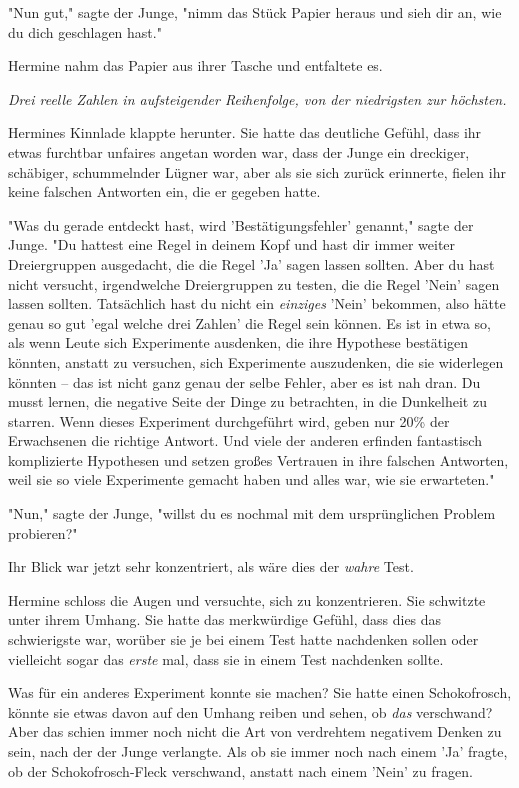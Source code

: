 {"Nun gut," sagte der Junge, "nimm das Stück Papier heraus und sieh dir an, wie du dich geschlagen hast."

Hermine nahm das Papier aus ihrer Tasche und entfaltete es.

\emph{Drei reelle Zahlen in aufsteigender Reihenfolge, von der niedrigsten zur höchsten.}

Hermines Kinnlade klappte herunter. Sie hatte das deutliche Gefühl, dass ihr etwas furchtbar unfaires angetan worden war, dass der Junge ein dreckiger, schäbiger, schummelnder Lügner war, aber als sie sich zurück erinnerte, fielen ihr keine falschen Antworten ein, die er gegeben hatte.

"Was du gerade entdeckt hast, wird 'Bestätigungsfehler' genannt," sagte der Junge. "Du hattest eine Regel in deinem Kopf und hast dir immer weiter Dreiergruppen ausgedacht, die die Regel 'Ja' sagen lassen sollten. Aber du hast nicht versucht, irgendwelche Dreiergruppen zu testen, die die Regel 'Nein' sagen lassen sollten. Tatsächlich hast du nicht ein \emph{einziges} 'Nein' bekommen, also hätte genau so gut 'egal welche drei Zahlen' die Regel sein können. Es ist in etwa so, als wenn Leute sich Experimente ausdenken, die ihre Hypothese bestätigen könnten, anstatt zu versuchen, sich Experimente auszudenken, die sie widerlegen könnten -- das ist nicht ganz genau der selbe Fehler, aber es ist nah dran. Du musst lernen, die negative Seite der Dinge zu betrachten, in die Dunkelheit zu starren. Wenn dieses Experiment durchgeführt wird, geben nur 20\% der Erwachsenen die richtige Antwort. Und viele der anderen erfinden fantastisch komplizierte Hypothesen und setzen großes Vertrauen in ihre falschen Antworten, weil sie so viele Experimente gemacht haben und alles war, wie sie erwarteten."

"Nun," sagte der Junge, "willst du es nochmal mit dem ursprünglichen Problem probieren?"

Ihr Blick war jetzt sehr konzentriert, als wäre dies der \emph{wahre} Test.

Hermine schloss die Augen und versuchte, sich zu konzentrieren. Sie schwitzte unter ihrem Umhang. Sie hatte das merkwürdige Gefühl, dass dies das schwierigste war, worüber sie je bei einem Test hatte nachdenken sollen oder vielleicht sogar das \emph{erste} mal, dass sie in einem Test nachdenken sollte.

Was für ein anderes Experiment konnte sie machen? Sie hatte einen Schokofrosch, könnte sie etwas davon auf den Umhang reiben und sehen, ob \emph{das} verschwand? Aber das schien immer noch nicht die Art von verdrehtem negativem Denken zu sein, nach der der Junge verlangte. Als ob sie immer noch nach einem 'Ja' fragte, ob der Schokofrosch-Fleck verschwand, anstatt nach einem 'Nein' zu fragen.

}
